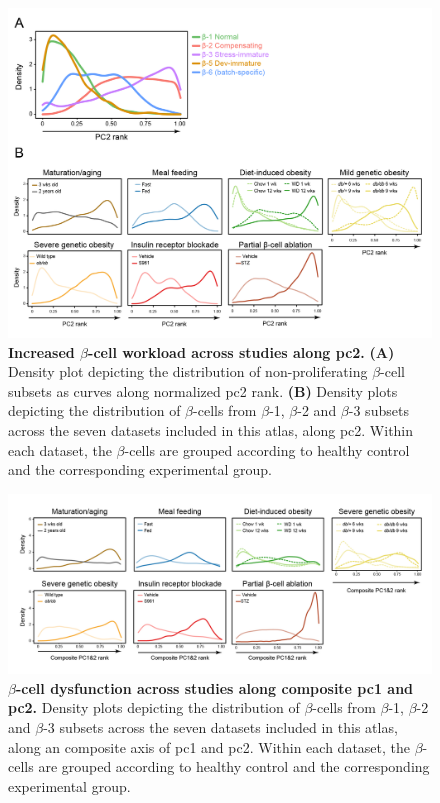 \begin{figure}[H]
\centering
\includegraphics[width=\linewidth]{Appendix2/Fig/F3-7-03.png}
\caption[Increased $\beta$-cell workload across studies along 2]{\textbf{Increased $\beta$-cell workload across studies along \gls{pc}2.} \textbf{(A)} Density plot depicting the distribution of non-proliferating $\beta$-cell subsets as curves along normalized \gls{pc}2 rank. \textbf{(B)} Density plots depicting the distribution of $\beta$-cells from $\beta$-1, $\beta$-2 and $\beta$-3 subsets across the seven datasets included in this atlas, along \gls{pc}2. Within each dataset, the $\beta$-cells are grouped according to healthy control and the corresponding experimental group.}
\label{fig:app_chp3_pc2}
\end{figure}


\begin{figure}[H]
\centering
\includegraphics[width=\linewidth]{Appendix2/Fig/F3-7-01.png}
\caption[$\beta$-cell dysfunction across studies along composite 1 and 2]{\textbf{$\beta$-cell dysfunction across studies along composite \gls{pc}1 and \gls{pc}2.} Density plots depicting the distribution of $\beta$-cells from $\beta$-1, $\beta$-2 and $\beta$-3 subsets across the seven datasets included in this atlas, along an composite axis of \gls{pc}1 and \gls{pc}2. Within each dataset, the $\beta$-cells are grouped according to healthy control and the corresponding experimental group.}
\label{fig:app_chp3_pc12}
\end{figure}


